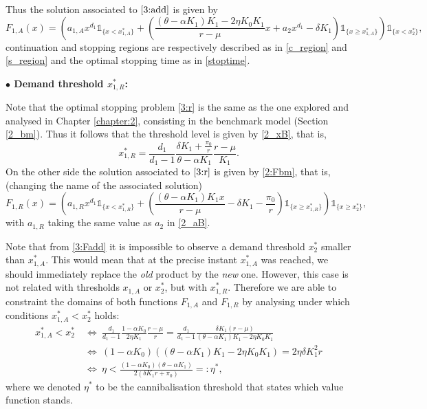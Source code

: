 Thus the solution associated to $\eqref{3:add}$ is given by 
\begin{equation}
F_{1,A}(x)= \left(  a_{1,A}x^{d_1} \mathds{1}_{ \{ x<x^*_{1,A}\}} +
\left(  \frac{(\theta-\alpha K_1)K_1-2 \eta K_0 K_1}{r-\mu} x+
a_2 x^{d_1} - \delta K_1 \right)  \mathds{1}_{ \{ x \geq x^*_{1,A} \}} \right)  \mathds{1}_{ \{   x < x_2^*  \}},
\label{3:Fadd}
\end{equation}
continuation and stopping regions are respectively described as in \eqref{c_region} and \eqref{s_region} and the optimal stopping time as in \eqref{stoptime}.


\textbf{$\bullet$ Demand threshold $x^*_{1,R}$:}

Note that the optimal stopping problem \eqref{3:r} is the same as the one explored and analysed in Chapter \ref{chapter:2}, consisting in the benchmark model (Section \ref{2_bm}).
Thus it follows that the threshold level is given by \eqref{2_xB}, that is,
\begin{equation}
x^*_{1,R}=\frac{d_1}{d_1-1} \frac{ \delta K_1  +\frac{\pi_0}{r} }{\theta-\alpha K_1} \frac{r-\mu}{K_1}.
\label{3_x1R}
\end{equation}
On the other side the solution associated to $\eqref{3:r}$ is given by \eqref{2:Fbm}, that is, (changing the name of the associated solution)
\begin{equation}
F_{1,R}(x)= \left(  a_{1,R}x^{d_1} \mathds{1}_{ \{ x<x^*_{1,R}\}} +
\left(  \frac{(\theta-\alpha K_1)K_1 x}{r-\mu} - \delta K_1  -\frac{\pi_0}{r}\right)  \mathds{1}_{ \{ x \geq x^*_{1,R}\}} \right) \mathds{1}_{ \{ x \geq x^*_2\}} ,
\label{3:Fr}
\end{equation}
with $a_{1,R}$ taking the same value as $a_2$ in \eqref{2_aB}.


Note that from \eqref{3:Fadd} it is impossible to observe a demand threshold $x_2^*$ smaller than $x_{1,A}^*$. This would mean that at the precise instant $x_{1,A}^*$ was reached, we should immediately replace the \textit{old} product by the \textit{new} one. However, this case is not related with thresholds $x_{1,A}$ or $x_2^*$, but with $x_{1,R}^*$.
Therefore we are able to constraint the domains of both functions $F_{1,A}$ and $F_{1,R}$ by analysing under which conditions $x_{1,A}^*<x^*_2$ holds:
\begin{align}
x_{1,A}^*<x_2^* \ &\Leftrightarrow \ \frac{d_1}{d_1-1} \frac{1-\alpha K_0}{2 \eta K_1} \frac{r-\mu}{r} = \frac{d_1}{d_1-1} \frac{\delta K_1 (r-\mu)}{(\theta-\alpha K_1)K_1-2\eta K_0 K_1} \nonumber \\
&\Leftrightarrow \ (1-\alpha K_0) ((\theta-\alpha K_1)K_1-2\eta K_0 K_1)=2 \eta \delta K_1^2 r 
 \nonumber \\
&\Leftrightarrow \ \eta <\frac{(1-\alpha K_0)(\theta-\alpha K_1)}{2(\delta K_1 r + \pi_0)}=: \eta^*, \label{3_eta*}
\end{align}
where we denoted $\eta^*$ to be the cannibalisation threshold that states which value function stands.

